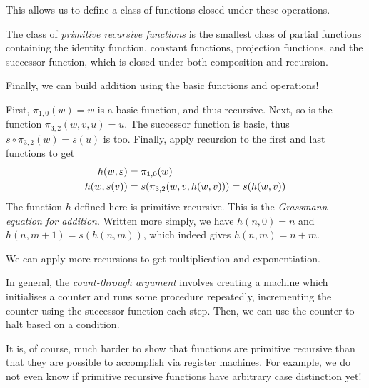 \documentclass{article}
\begin{document}
This allows us to define a class of functions closed under these operations.

\begin{definition}
	The class of \textit{primitive recursive functions} is the smallest class of partial functions containing the identity function, constant functions, projection functions, and the successor function, which is closed under both composition and recursion.
\end{definition}

Finally, we can build addition using the basic functions and operations!

First, $\pi_{1,0}(w) = w$ is a basic function, and thus recursive. Next, so is the function $\pi_{3,2}(w, v, u) = u$. The successor function is basic, thus $s \circ \pi_{3,2}(w) = s(u)$ is too. Finally, apply recursion to the first and last functions to get
\begin{align*}
	h(w, \varepsilon) & = \pi_{1,0}(w)                             \\
	h(w, s(v)) & = s(\pi_{3,2}(w, v, h(w, v))) = s(h(w, v)) 
\end{align*}
The function $h$ defined here is primitive recursive. This is the \textit{Grassmann equation for addition}. Written more simply, we have $h(n, 0) = n$ and $h(n, m+1) = s(h(n, m))$, which indeed gives $h(n, m) = n + m$.

We can apply more recursions to get multiplication and exponentiation.

In general, the \textit{count-through argument} involves creating a machine which initialises a counter and runs some procedure repeatedly, incrementing the counter using the successor function each step. Then, we can use the counter to halt based on a condition.

It is, of course, much harder to show that functions are primitive recursive than that they are possible to accomplish via register machines. For example, we do not even know if primitive recursive functions have arbitrary case distinction yet!
\end{document}
